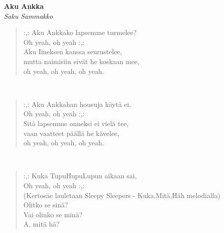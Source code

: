 %
%
\noindent\begin{minipage}{\linewidth}
\vspace{5pt}
\parbox[t]{0.85\linewidth}{\raggedright {\large\bf Aku Ankka}\\[2pt]\small\emph{Saku Sammakko}\\[6pt]}
\begin{verse}
	\hspace{0pt-\widthof{:,: }}:,: Aku Ankkako lapsemme turmelee?\\
	Oh yeah, oh yeah :,:\\
	Aku Iineksen kanssa seurustelee,\\
	mutta naimisiin eivät he koskaan mee,\\
	oh yeah, oh yeah, oh yeah.\\
\end{verse}
\end{minipage}\\[10pt]
\noindent\begin{minipage}{\linewidth}
\begin{verse}
	\hspace{0pt-\widthof{:,: }}:,: Aku Ankkahan housuja käytä ei,\\
	Oh yeah, oh yeah :,:\\
	Sitä lapsemme onneksi ei vielä tee,\\
	vaan vaatteet päällä he kävelee,\\
	oh yeah, oh yeah, oh yeah.\\
\end{verse}
\end{minipage}\\[10pt]
\noindent\begin{minipage}{\linewidth}
\begin{verse}
	\hspace{0pt-\widthof{:,: }}:,: Kuka TupuHupuLupun aikaan sai,\\
	Oh yeah, oh yeah :,:\\
	(Kertosäe lauletaan Sleepy Sleepers - Kuka,Mitä,Häh melodialla)\\
	Olitko se sinä?\\
	Vai olinko se minä?\\
	A, mitä hä?\\
\end{verse}
\end{minipage}\\[10pt]
